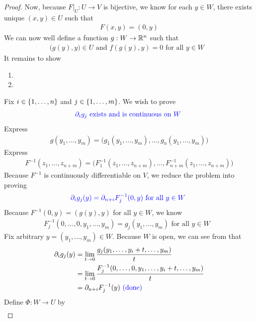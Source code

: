 \documentclass{report}
\begin{document}
\begin{proof}
Now, because $F|_U:U\rightarrow V$ is bijective, we know for each $y\in W$, there exists unique $(x,y)\in U$ such that 
\begin{align*}
F(x,y)=(0,y)
\end{align*}
We can now well define a function $g:W\rightarrow \mathbb{R}^n$ such that 
\begin{align*}
\Big(g(y),y \Big)\in U\text{ and }f(g(y),y)=0\text{ for all $y \in W$ }
\end{align*}
It remains to show 
\begin{enumerate}[label=(\alph*)]
  \item {}
  \item  {}
\end{enumerate}
Fix $i \in \{ 1,\dots ,n \}$ and $j \in \{ 1,\dots ,m \}$. We wish to prove 
\begin{align*}
\textcolor{blue}{\partial_i g_j\text{ exists and is continuous on $W$ }}
\end{align*}
Express 
\begin{align*}
g(y_1,\dots ,y_m)=\Big(g_1(y_1,\dots ,y_m),\dots , g_n(y_1,\dots ,y_m) \Big)
\end{align*}
Express 
\begin{align*}
F^{-1}(z_1,\dots ,z_{n+m})= \Big(F^{-1}_1(z_1,\dots ,z_{n+m}), \dots , F^{-1}_{n+m}(z_1,\dots ,z_{n+m}) \Big)
\end{align*}
Because $F^{-1}$ is continuously differentiable on $V$, we reduce the problem into proving 
\begin{align*}
  \textcolor{blue}{\partial_i g_j (y)=\partial_{n+i} F^{-1}_j (0,y)\text{ for all $y\in W$ }}
\end{align*}
Because $F^{-1}(0,y)=(g(y),y)$ for all $y \in W$, we know  
\begin{align}
\label{F-1g}
F^{-1}_j (0,\dots , 0 ,y_1,\dots ,y_m)=g_j(y_1, \dots ,y_m) \text{ for all $y \in W$ }
\end{align}
Fix arbitrary $y=(y_1,\dots ,y_m)\in W$. Because $W$ is open, we can see from  that 
\begin{align*}
\partial_i g_j(y)&=\lim_{t\to 0} \frac{g_j(y_1,\dots ,y_i +t, \dots ,y_m)}{t}\\
&=\lim_{t\to 0} \frac{F^{-1}_j(0,\dots ,0, y_1,\dots, y_i+t,\dots ,y_m)}{t}\\
&=\partial_{n+i}F_j^{-1}(y) \textcolor{blue}{\text{ (done) }}
\end{align*}
Define $\Phi: W \rightarrow U$ by 
\begin{align*}

\end{align*}
\end{proof}
\end{document}
